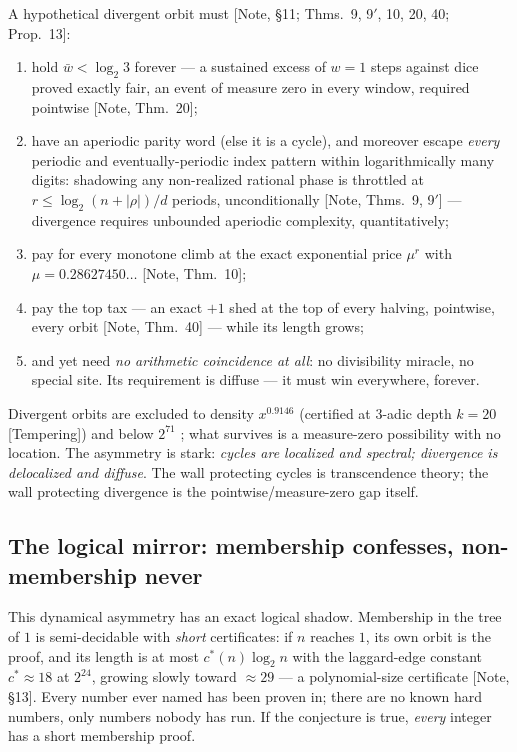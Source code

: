\documentclass[11pt]{article}
\theoremstyle{definition}
\theoremstyle{remark}
\newcommand{\anchor}[1]{\textup{[#1]}}
\begin{document}
A hypothetical divergent orbit must \anchor{Note, \S11; Thms.~9, 9$'$, 10, 20,
40; Prop.~13}:
\begin{enumerate}[leftmargin=2em, itemsep=1pt]
\item hold $\bar{w} < \log_2 3$ forever --- a sustained excess of $w=1$ steps
against dice proved exactly fair, an event of measure zero in every window,
required pointwise \anchor{Note, Thm.~20};
\item have an aperiodic parity word (else it is a cycle), and moreover escape
\emph{every} periodic and eventually-periodic index pattern within
logarithmically many digits: shadowing any non-realized rational phase is
throttled at $r \leq \log_2(n+|\rho|)/d$ periods, unconditionally
\anchor{Note, Thms.~9, 9$'$} --- divergence requires unbounded aperiodic
complexity, quantitatively;
\item pay for every monotone climb at the exact exponential price
$\mu^r$ with $\mu = 0.28627450\ldots$ \anchor{Note, Thm.~10};
\item pay the top tax --- an exact $+1$ shed at the top of every halving,
pointwise, every orbit \anchor{Note, Thm.~40} --- while its length grows;
\item and yet need \emph{no arithmetic coincidence at all}: no divisibility
miracle, no special site. Its requirement is diffuse --- it must win
everywhere, forever.
\end{enumerate}
Divergent orbits are excluded to density $x^{0.9146}$ (certified at $3$-adic
depth $k=20$ \anchor{Tempering}) and below $2^{71}$ \cite{Barina2021}; what
survives is a measure-zero possibility with no location. The asymmetry is
stark: \emph{cycles are localized and spectral; divergence is delocalized and
diffuse}. The wall protecting cycles is transcendence theory; the wall
protecting divergence is the pointwise/measure-zero gap itself.

\subsection{The logical mirror: membership confesses, non-membership never}

This dynamical asymmetry has an exact logical shadow. Membership in the tree
of $1$ is semi-decidable with \emph{short} certificates: if $n$ reaches $1$,
its own orbit is the proof, and its length is at most $c^*(n)\log_2 n$ with
the laggard-edge constant $c^* \approx 18$ at $2^{24}$, growing slowly toward
$\approx 29$ --- a polynomial-size certificate \anchor{Note, \S13}. Every
number ever named has been proven in; there are no known hard numbers, only
numbers nobody has run. If the conjecture is true, \emph{every} integer has a
short membership proof.
\end{document}
